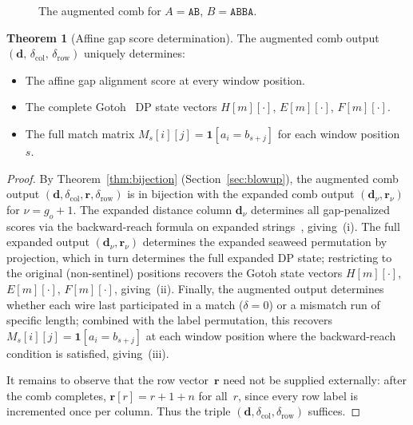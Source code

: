 \documentclass[11pt, a4paper]{article}
\theoremstyle{definition}
\newtheorem{theorem}{Theorem}
\theoremstyle{remark}
\newcommand{\dcol}{\mathbf{d}}
\newcommand{\drow}{\mathbf{r}}
\begin{document}
\begin{figure}[!htbp]
\centering

\caption{The augmented comb for $A = \texttt{AB}$,
  $B = \texttt{ABBA}$.}
\label{fig:augmented}
\end{figure}

\begin{theorem}[Affine gap score determination]
\label{thm:score-determination}
The augmented comb output
$(\dcol,\, \delta_{\mathrm{col}},\, \delta_{\mathrm{row}})$
uniquely determines:
\begin{itemize}
  \item[\textup{(i)}] The affine gap alignment score at every
    window position.
  \item[\textup{(ii)}] The complete
    Gotoh~\cite{gotoh1982improved} DP state vectors
    $H[m][\cdot]$, $E[m][\cdot]$, $F[m][\cdot]$.
  \item[\textup{(iii)}] The full match matrix
    $M_s[i][j] = \mathbf{1}[a_i = b_{s+j}]$ for each window
    position~$s$.
\end{itemize}
\end{theorem}

\begin{proof}
By Theorem~\ref{thm:bijection}
(Section~\ref{sec:blowup}), the augmented comb output
$(\dcol, \delta_{\mathrm{col}}, \drow,
\delta_{\mathrm{row}})$ is in bijection with the expanded
comb output $(\dcol_\nu, \drow_\nu)$ for
$\nu = g_o + 1$.
The expanded distance column
$\dcol_\nu$ determines all gap-penalized scores via the
backward-reach formula on expanded
strings~\cite{tiskin2008semi}, giving~(i).
The full
expanded output $(\dcol_\nu, \drow_\nu)$ determines the
expanded seaweed permutation by projection, which in turn
determines the full expanded DP state;
restricting to the
original (non-sentinel) positions recovers the Gotoh state
vectors $H[m][\cdot]$, $E[m][\cdot]$, $F[m][\cdot]$,
giving~(ii).
Finally, the augmented output determines
whether each wire last participated in a match
($\delta = 0$) or a mismatch run of specific length;
combined with the label permutation, this recovers
$M_s[i][j] = \mathbf{1}[a_i = b_{s+j}]$ at each window
position where the backward-reach condition is satisfied,
giving~(iii).

It remains to observe that the row vector~$\drow$ need not
be supplied externally: after the comb completes,
$\drow[r] = r + 1 + n$ for all~$r$, since every row label
is incremented once per column.
Thus the triple
$(\dcol, \delta_{\mathrm{col}},
\delta_{\mathrm{row}})$ suffices.
\end{proof}
\end{document}
